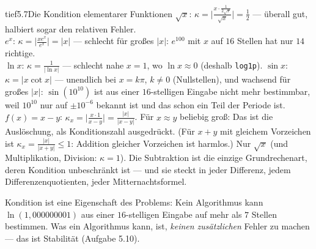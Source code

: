 \begin{loesungkarte}{tief}{5.7}{Die Kondition elementarer Funktionen}
$\sqrt x$: $\kappa = \bigl|\frac{x\cdot\frac1{2\sqrt x}}{\sqrt x}\bigr| = \frac12$ --- überall gut, halbiert sogar den relativen Fehler. \\
$e^{x}$: $\kappa = \bigl|\frac{xe^{x}}{e^{x}}\bigr| = |x|$ --- schlecht für großes $|x|$: $e^{100}$ mit $x$ auf $16$ Stellen hat nur $14$ richtige. \\
$\ln x$: $\kappa = \frac1{|\ln x|}$ --- schlecht nahe $x = 1$, wo $\ln x\approx0$ (deshalb \texttt{log1p}).
$\sin x$: $\kappa = |x\cot x|$ --- unendlich bei $x = k\pi$, $k\neq0$ (Nullstellen), und wachsend für großes $|x|$: $\sin(10^{10})$ ist aus einer $16$-stelligen Eingabe nicht mehr bestimmbar, weil $10^{10}$ nur auf $\pm10^{-6}$ bekannt ist und das schon ein Teil der Periode ist.
$f(x) = x - y$: $\kappa_x = \bigl|\frac{x\cdot1}{x - y}\bigr| = \frac{|x|}{|x - y|}$. Für $x\approx y$ beliebig groß: Das ist die Auslöschung, als Konditionszahl ausgedrückt. (Für $x + y$ mit gleichem Vorzeichen ist $\kappa_x = \frac{|x|}{|x + y|}\le1$: Addition gleicher Vorzeichen ist harmlos.)
Nur $\sqrt x$ (und Multiplikation, Division: $\kappa = 1$). Die Subtraktion ist die einzige Grundrechenart, deren Kondition unbeschränkt ist --- und sie steckt in jeder Differenz, jedem Differenzenquotienten, jeder Mitternachtsformel.
\begin{mitnehmen}\kastentext
Kondition ist eine Eigenschaft des Problems: Kein Algorithmus kann $\ln(1{,}000000001)$ aus einer $16$-stelligen Eingabe auf mehr als $7$ Stellen bestimmen. Was ein Algorithmus kann, ist, \emph{keinen zusätzlichen} Fehler zu machen --- das ist Stabilität (Aufgabe 5.10).
\end{mitnehmen}
\end{loesungkarte}

